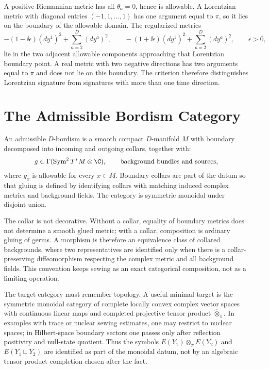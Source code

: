 \begin{example}
\label{ex:ks-basic-metrics}
A positive Riemannian metric has all \(\theta_a=0\), hence is allowable.  A
Lorentzian metric with diagonal entries \((-1,1,\ldots,1)\) has one argument
equal to \(\pi\), so it lies on the boundary of the allowable domain.  The
regularized metrics
\[
  -(1-\ii\epsilon)(dy^1)^2+\sum_{a=2}^D(dy^a)^2,
  \qquad
  -(1+\ii\epsilon)(dy^1)^2+\sum_{a=2}^D(dy^a)^2,
  \qquad \epsilon>0,
\]
lie in the two adjacent allowable components approaching that Lorentzian
boundary point.  A real metric with two negative directions has two arguments
equal to \(\pi\) and does not lie on this boundary.  The criterion therefore
distinguishes Lorentzian signature from signatures with more than one time
direction.
\end{example}

\section{The Admissible Bordism Category}

\begin{definition}
\label{def:ks-admissible-bordism}
An admissible \(D\)-bordism is a smooth compact \(D\)-manifold \(M\) with
boundary decomposed into incoming and outgoing collars, together with:
\[
  g\in\Gamma(\operatorname{Sym}^2T^*M\otimes\C),
  \qquad
  \text{background bundles and sources},
\]
where \(g_x\) is allowable for every \(x\in M\).  Boundary collars are part of
the datum so that gluing is defined by identifying collars with matching
induced complex metrics and background fields.  The category is symmetric
monoidal under disjoint union.
\end{definition}

The collar is not decorative.  Without a collar, equality of boundary metrics
does not determine a smooth glued metric; with a collar, composition is
ordinary gluing of germs.  A morphism is therefore an equivalence class of
collared backgrounds, where two representatives are identified only when
there is a collar-preserving diffeomorphism respecting the complex metric and
all background fields.  This convention keeps sewing as an exact categorical
composition, not as a limiting operation.

The target category must remember topology.  A useful minimal target is the
symmetric monoidal category of complete locally convex complex vector spaces
with continuous linear maps and completed projective tensor product
\(\widehat\otimes_\pi\).  In examples with trace or nuclear sewing estimates,
one may restrict to nuclear spaces; in Hilbert-space boundary sectors one
passes only after reflection positivity and null-state quotient.  Thus the
symbols \(E(Y_1)\widehat\otimes_\pi E(Y_2)\) and \(E(Y_1\sqcup Y_2)\) are
identified as part of the monoidal datum, not by an algebraic tensor product
completion chosen after the fact.

